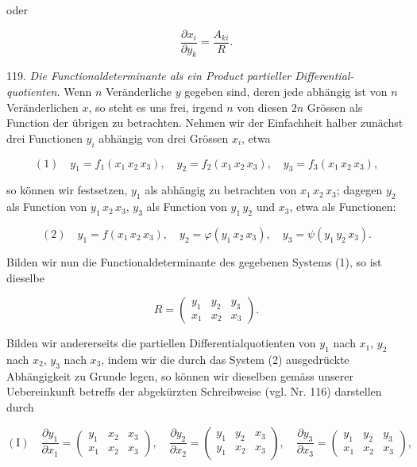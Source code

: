 \documentclass[11pt]{article}
\providecommand{\weberpage}[1]{}
\begin{document}
oder

\[
\dfrac{\partial x_i}{\partial y_k} = \dfrac{A_{ki}}{R}.
\]

119. \textit{Die Functionaldeterminante als ein Product partieller Differential-
quotienten.} %
Wenn $n$ Veränderliche $y$ gegeben sind, deren jede abhängig
ist von $n$ Veränderlichen $x$, so steht es uns frei, irgend $n$ von diesen
$2n$ Grössen als Function der übrigen zu betrachten. Nehmen wir
der Einfachheit halber zunächst drei Functionen $y_i$ abhängig von drei
Grössen $x_i$, etwa

\[
(1) \quad y_1 = f_1(x_1\, x_2\, x_3), \quad y_2 = f_2(x_1\, x_2\, x_3), \quad y_3 = f_3(x_1\, x_2\, x_3),
\]

so können wir festsetzen, $y_1$ als abhängig zu betrachten von $x_1\, x_2\, x_3$;
dagegen $y_2$ als Function von $y_1\, x_2\, x_3$, $y_3$ als Function von $y_1\, y_2$ und $x_3$,
etwa als Functionen:

\[
(2) \quad y_1 = f(x_1\, x_2\, x_3), \quad y_2 = \varphi(y_1\, x_2\, x_3), \quad y_3 = \psi(y_1\, y_2\, x_3).
\]

Bilden wir nun die Functionaldeterminante des gegebenen Systems (1),
so ist dieselbe

\[
R = \begin{pmatrix} y_1 & y_2 & y_3 \\ x_1 & x_2 & x_3 \end{pmatrix}.
\]

Bilden wir andererseits die partiellen Differentialquotienten von $y_1$
nach $x_1$, $y_2$ nach $x_2$, $y_3$ nach $x_3$, indem wir die durch das System (2)
ausgedrückte Abhängigkeit zu Grunde legen, so können wir dieselben
gemäss unserer Uebereinkunft betreffs der abgekürzten Schreibweise
(vgl. Nr. 116) darstellen durch


\weberpage{126}
\[
(\mathrm{I}) \quad \dfrac{\partial y_1}{\partial x_1} = \begin{pmatrix} y_1 & x_2 & x_3 \\ x_1 & x_2 & x_3 \end{pmatrix}, \quad
\dfrac{\partial y_2}{\partial x_2} = \begin{pmatrix} y_1 & y_2 & x_3 \\ y_1 & x_2 & x_3 \end{pmatrix}, \quad
\dfrac{\partial y_3}{\partial x_3} = \begin{pmatrix} y_1 & y_2 & y_3 \\ x_1 & x_2 & x_3 \end{pmatrix},
\]
\end{document}
